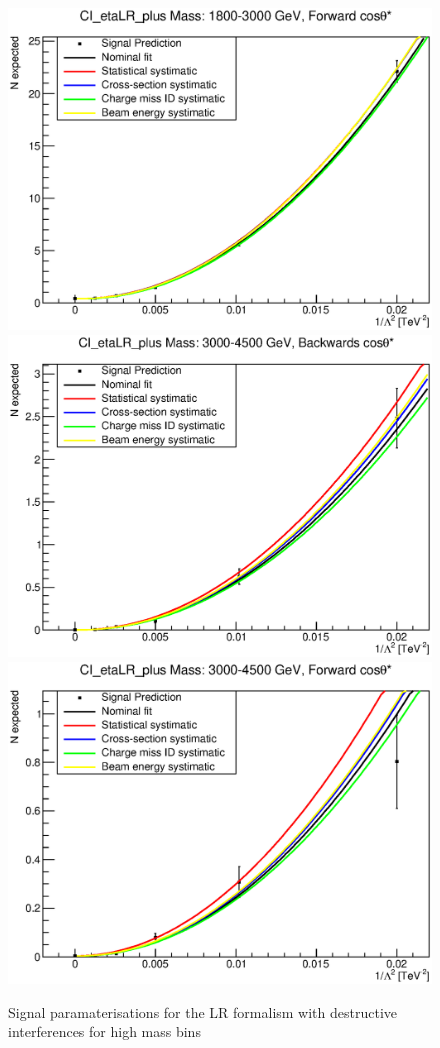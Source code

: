 \begin{figure}[ht]
			\includegraphics[width=0.49\linewidth]{images/thesis_fits/CI_2D_etaLR_plus_Mass_1800-3000_GeV_CTS_0_1.eps}
			\includegraphics[width=0.49\linewidth]{images/thesis_fits/CI_2D_etaLR_plus_Mass_3000-4500_GeV_CTS_-1_0.eps}
			\includegraphics[width=0.49\linewidth]{images/thesis_fits/CI_2D_etaLR_plus_Mass_3000-4500_GeV_CTS_0_1.eps}
		\caption{Signal paramaterisations for the LR formalism with destructive interferences for high mass bins}
		\label{fig:parm_LR_p_2}
	\end{figure}


